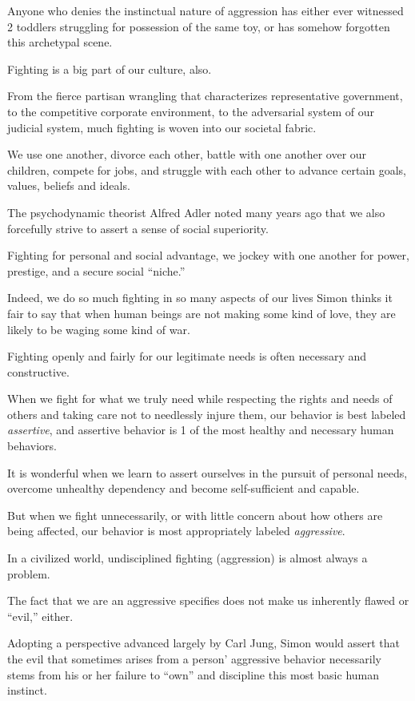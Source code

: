 \documentclass[oneside]{book}
\numberwithin{equation}{section}
\begin{document}
Anyone who denies the instinctual nature of aggression has either ever witnessed 2 toddlers struggling for possession of the same toy, or has somehow forgotten this archetypal scene.

Fighting is a big part of our culture, also.

From the fierce partisan wrangling that characterizes representative government, to the competitive corporate environment, to the adversarial system of our judicial system, much fighting is woven into our societal fabric.

We use one another, divorce each other, battle with one another over our children, compete for jobs, and struggle with each other to advance certain goals, values, beliefs and ideals.

The psychodynamic theorist Alfred Adler noted many years ago that we also forcefully strive to assert a sense of social superiority.

Fighting for personal and social advantage, we jockey with one another for power, prestige, and a secure social ``niche.''

Indeed, we do so much fighting in so many aspects of our lives Simon thinks it fair to say that when human beings are not making some kind of love, they are likely to be waging some kind of war.

%

Fighting openly and fairly for our legitimate needs is often necessary and constructive.

When we fight for what we truly need while respecting the rights and needs of others and taking care not to needlessly injure them, our behavior is best labeled \textit{assertive}, and assertive behavior is 1 of the most healthy and necessary human behaviors.

It is wonderful when we learn to assert ourselves in the pursuit of personal needs, overcome unhealthy dependency and become self-sufficient and capable.

But when we fight unnecessarily, or with little concern about how others are being affected, our behavior is most appropriately labeled \textit{aggressive}.

In a civilized world, undisciplined fighting (aggression) is almost always a problem.

The fact that we are an aggressive specifies does not make us inherently flawed or ``evil,'' either.

Adopting a perspective advanced largely by Carl Jung, Simon would assert that the evil that sometimes arises from a person' aggressive behavior necessarily stems from his or her failure to ``own'' and discipline this most basic human instinct.
\end{document}

